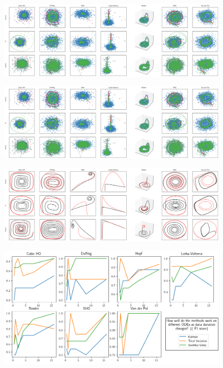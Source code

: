 \documentclass{article}
\begin{document}
\begin{figure}
    \includegraphics[width=\textwidth]{images/summary_train}
\end{figure}
\begin{figure}
    \label{fig:train}
    \includegraphics[width=\textwidth]{images/summary_train}
\end{figure}
\begin{figure}
    \label{fig:test}
    \includegraphics[width=\textwidth]{images/summary_test}
\end{figure}
\begin{figure}
    \label{fig:f1}
    \includegraphics[width=\textwidth]{images/summary_f1}
\end{figure}
\end{document}
